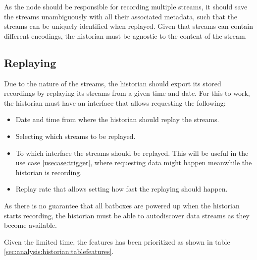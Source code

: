As the node should be responsible for recording multiple streams, it should save the streams unambiguously with all their associated metadata, such that the streams can be uniquely identified when replayed.
Given that streams can contain different encodings, the historian must be agnostic to the content of the stream.



\subsection{Replaying}
Due to the nature of the streams, the historian should export its stored recordings by replaying its streams from a given time and date. For this to work, the historian must have an interface that allows requesting the following:

\begin{itemize}
	\item Date and time from where the historian should replay the streams.
	\item Selecting which streams to be replayed.
	\item To which interface the streams should be replayed. This will be useful in the use case \ref{usecase:trigger}, where requesting data might happen meanwhile the historian is recording.
	\item Replay rate that allows setting how fast the replaying should happen. 
\end{itemize}

As there is no guarantee that all batboxes are powered up when the historian starts recording, the historian must be able to autodiscover data streams as they become available.
 
 
Given the limited time, the features has been prioritized as shown in table \ref{sec:analysis:historian:tablefeatures}.

